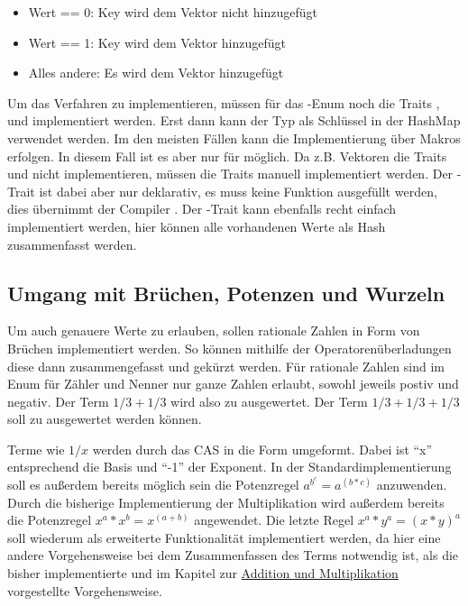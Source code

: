 \documentclass[11pt,a4paper, ngerman]{article}
\begin{document}
\begin{itemize}
    \item Wert == 0: Key wird dem Vektor nicht hinzugefügt
    \item Wert == 1: Key wird dem Vektor hinzugefügt
    \item Alles andere: Es wird dem Vektor  hinzugefügt
\end{itemize}

Um das Verfahren zu implementieren, müssen für das -Enum noch die Traits ,  und  implementiert werden. Erst dann kann der Typ  als Schlüssel in der HashMap verwendet werden. Im den meisten Fällen kann die Implementierung über Makros erfolgen. In diesem Fall ist es aber nur für  möglich. Da z.B. Vektoren die Traits  und  nicht implementieren, müssen die Traits manuell implementiert werden. Der -Trait ist dabei aber nur deklarativ, es muss keine Funktion ausgefüllt werden, dies übernimmt der Compiler \cite{RustEqTrait}. Der -Trait kann ebenfalls recht einfach implementiert werden, hier können alle vorhandenen Werte als Hash zusammenfasst werden.

\subsection{Umgang mit Brüchen, Potenzen und Wurzeln}
Um auch genauere Werte zu erlauben, sollen rationale Zahlen in Form von Brüchen implementiert werden. So können mithilfe der Operatorenüberladungen diese dann zusammengefasst und gekürzt werden. Für rationale Zahlen sind im Enum  für Zähler und Nenner nur ganze Zahlen erlaubt, sowohl jeweils postiv und negativ. Der Term $1/3+1/3$ wird also zu  ausgewertet. Der Term $1/3+1/3+1/3$ soll zu  ausgewertet werden können.

Terme wie $1/x$ werden durch das CAS in die Form  umgeformt. Dabei ist ``x'' entsprechend die Basis und ``-1'' der Exponent. In der Standardimplementierung soll es außerdem bereits möglich sein die Potenzregel $a^{b^{c}} = a^{(b*c)}$ anzuwenden. Durch die bisherige Implementierung der Multiplikation wird außerdem bereits die Potenzregel $x^a*x^b = x^{(a+b)}$ angewendet. Die letzte Regel $x^a*y^a = (x*y)^a$ soll wiederum als erweiterte Funktionalität implementiert werden, da hier eine andere Vorgehensweise bei dem Zusammenfassen des Terms notwendig ist, als die bisher implementierte und im Kapitel zur \hyperref[sec:kapAddnundMult]{Addition und Multiplikation} vorgestellte Vorgehensweise.
\end{document}
